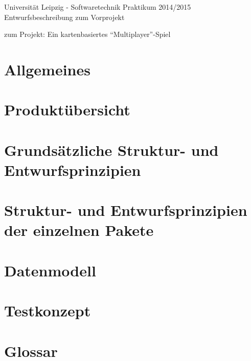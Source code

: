 \documentclass[11pt,a4paper]{article}
\begin{document}
\center \large Universität Leipzig - Softwaretechnik Praktikum 2014/2015\\
\center \Huge Entwurfsbeschreibung zum Vorprojekt \\
\par\bigskip

\small zum Projekt: Ein kartenbasiertes “Multiplayer”-Spiel

\par\bigskip

\tableofcontents

\clearpage

\flushleft
\section{Allgemeines}
\clearpage
\section{Produktübersicht}
\clearpage
\section{Grundsätzliche Struktur- und Entwurfsprinzipien}
\clearpage
\section{Struktur- und Entwurfsprinzipien der einzelnen Pakete}
\clearpage
\section{Datenmodell}
\clearpage
\section{Testkonzept}
\clearpage
\section{Glossar}
\clearpage
\end{document}
